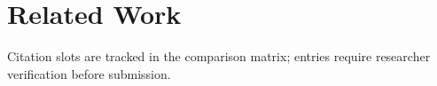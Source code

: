 \section{Related Work}Citation slots are tracked in the comparison matrix; entries require researcher verification before submission.
